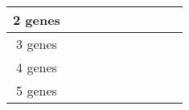 \documentclass[10pt]{article}
\begin{document}
\begin{table}[ht]
\begin{tabular}{|c|c|c|c|c|c|c|c|c|c|}
2 genes           &                                                        &                                                        &                                                        &                                                        &                                                       &                                                       &                                                        &                                                       &                                                       \\ \hline
3 genes           &                                                        &                                                        &                                                        &                                                        &                                                       &                                                       &                                                        &                                                       &                                                       \\ \hline
4 genes           &                                                        &                                                        &                                                        &                                                        &                                                       &                                                       &                                                        &                                                       &                                                       \\ \hline
5 genes           &                                                        &                                                        &                                                        &                                                        &                                                       &                                                       &                                                        &                                                       &                                                       \\ \hline
\end{tabular}
\end{table}
\end{document}
